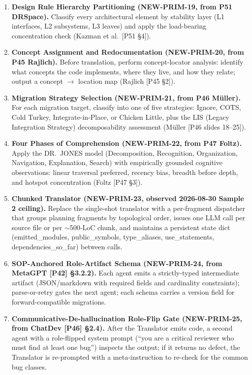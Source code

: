 \begin{enumerate}
\item \textbf{Design Rule Hierarchy Partitioning (NEW-PRIM-19, from P51 DRSpace).}
Classify every architectural element by stability layer (L1 interfaces, L2 subsystems, L3 leaves) and apply the load-bearing concentration check (Kazman et al.\ [P51 \S4]).

\item \textbf{Concept Assignment and Redocumentation (NEW-PRIM-20, from P45 Rajlich).}
Before translation, perform concept-locator analysis: identify what concepts the code implements, where they live, and how they relate; output a concept $\rightarrow$ location map (Rajlich [P45 \S2]).

\item \textbf{Migration Strategy Selection (NEW-PRIM-21, from P46 M\"uller).}
For each migration target, classify into one of five strategies: Ignore, COTS, Cold Turkey, Integrate-in-Place, or Chicken Little, plus the LIS (Legacy Integration Strategy) decomposability assessment (M\"uller [P46 slides 18--25]).

\item \textbf{Four Phases of Comprehension (NEW-PRIM-22, from P47 Foltz).}
Apply the DR.\ JONES model (Decomposition, Recognition, Organization, Navigation, Explanation, Search) with empirically grounded cognitive observations: linear traversal preferred, recency bias, breadth before depth, and hotspot concentration (Foltz [P47 \S3]).

\item \textbf{Chunked Translator (NEW-PRIM-23, observed 2026-08-30 Sample 2 ceiling).}
Replace the single-shot translator with a per-fragment dispatcher that groups planning fragments by topological order, issues one LLM call per source file or per $\sim$500-LoC chunk, and maintains a persistent state dict (emitted\_modules, public\_symbols, type\_aliases, use\_statements, dependencies\_so\_far) between calls.

\item \textbf{SOP-Anchored Role-Artifact Schema (NEW-PRIM-24, from MetaGPT [P42] \S3.2.2).}
Each agent emits a strictly-typed intermediate artifact (JSON/markdown with required fields and cardinality constraints); parse-or-retry gates the next agent; each schema carries a version field for forward-compatible migrations.

\item \textbf{Communicative-De-hallucination Role-Flip Gate (NEW-PRIM-25, from ChatDev [P46] \S2.4).}
After the Translator emits code, a second agent with a role-flipped system prompt (``you are a critical reviewer who must find at least one bug'') inspects the output; if it returns no defect, the Translator is re-prompted with a meta-instruction to re-check for the common bug classes.


\end{enumerate}
